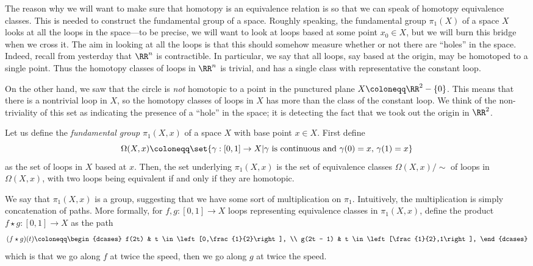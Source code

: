\documentclass{axolotl}
\begin{document}
The reason why we will want to make sure that homotopy is an equivalence
relation is so that we can speak of homotopy equivalence classes. This is
needed to construct the fundamental group of a space. Roughly speaking, the
fundamental group \(\pi_1(X)\) of a space \(X\) looks at all the loops in the
space---to be precise, we will want to look at loops based at some point \(x_0
  \in X\), but we will burn this bridge when we cross it. The aim in looking
at all the loops is that this should somehow measure whether or not there are
``holes'' in the space. Indeed, recall from yesterday that \(\RR^n\) is contractible.
In particular, we say that all loops, say based at the origin, may be homotoped
to a single point. Thus the homotopy classes of loops in \(\RR^n\) is trivial,
and has a single class with representative the constant loop.

On the other hand, we saw that the circle is \emph{not} homotopic to a point in
the punctured plane \(X \coloneqq \RR^2 - \{0\}\). This means that there is
a nontrivial loop in \(X\), so the homotopy classes of loops in \(X\) has more
than the class of the constant loop. We think of the non-triviality of this set
as indicating the presence of a ``hole'' in the space; it is detecting the fact
that we took out the origin in \(\RR^2\).

Let us define the \emph{fundamental group} \(\pi_1(X,x)\) of a space \(X\) with
base point \(x \in X\). First define
\[ \Omega(X,x) \coloneqq \set{\gamma: [0,1] \to X | \text{\(\gamma\) is continuous and \(\gamma(0) = x\), \(\gamma(1) = x\)}} \]
as the set of loops in \(X\) based at \(x\). Then, the set underlying
\(\pi_1(X,x)\) is the set of equivalence classes \(\Omega(X,x)/\sim\) of loops
in \(\Omega(X,x)\), with two loops being equivalent if and only if they are
homotopic.

We say that \(\pi_1(X,x)\) is a group, suggesting that we have some sort of
multiplication on \(\pi_1\). Intuitively, the multiplication is simply concatenation
of paths. More formally, for \(f,g: [0,1] \to X\) loops representing equivalence
classes in \(\pi_1(X,x)\), define the product \(f \star g: [0,1] \to X\) as the
path
\[ (f \star g)(t) \coloneqq \begin{dcases}
    f(2t) & t \in \left[0,\frac{1}{2}\right], \\
    g(2t - 1) & t \in \left[\frac{1}{2},1\right],
  \end{dcases}
\]
which is that we go along \(f\) at twice the speed, then we go along \(g\) at
twice the speed.
\end{document}
